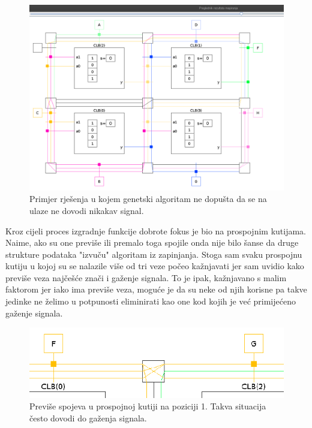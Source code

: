 \documentclass[times, utf8, zavrsni]{fer}
\begin{document}
	
	
	\begin{figure}[H]
		\centering
		\includegraphics[width=18cm]{slike/withoutBlackLabel.png}
		\caption{Primjer rješenja u kojem genetski algoritam ne dopušta da se na ulaze ne dovodi nikakav signal.}
		\label{fig:black-label}
	\end{figure} 
	
	
	Kroz cijeli proces izgradnje funkcije dobrote fokus je bio na prospojnim kutijama. Naime, ako su one previše ili premalo toga spojile onda nije bilo šanse da druge strukture podataka "izvuču" algoritam iz zapinjanja. Stoga sam svaku prospojnu kutiju u kojoj su se nalazile više od tri veze počeo kažnjavati jer sam uvidio kako previše veza najčešće znači i gaženje signala. To je ipak, kažnjavano s malim faktorom jer iako ima previše veza, moguće je da su neke od njih korisne pa takve jedinke ne želimo u potpunosti eliminirati kao one kod kojih je već primijećeno gaženje signala. 
	
	
	
	\begin{figure}[H]
		\centering
		\includegraphics[width=18cm]{slike/isjecakPreviseVeza.png}
		\caption{Previše spojeva u prospojnoj kutiji na poziciji 1. Takva situacija često dovodi do gaženja signala. }
		\label{fig:previse-veza}
	\end{figure} 
	
\end{document}
